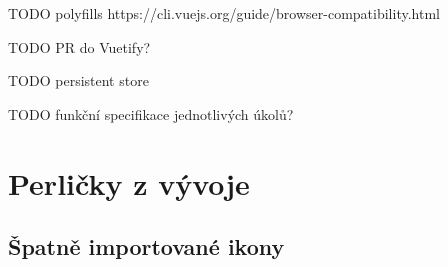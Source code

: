 TODO polyfills https://cli.vuejs.org/guide/browser-compatibility.html

TODO PR do Vuetify?

TODO persistent store

TODO funkční specifikace jednotlivých úkolů?


\section{Perličky z vývoje}

\subsection{Špatně importované ikony}

